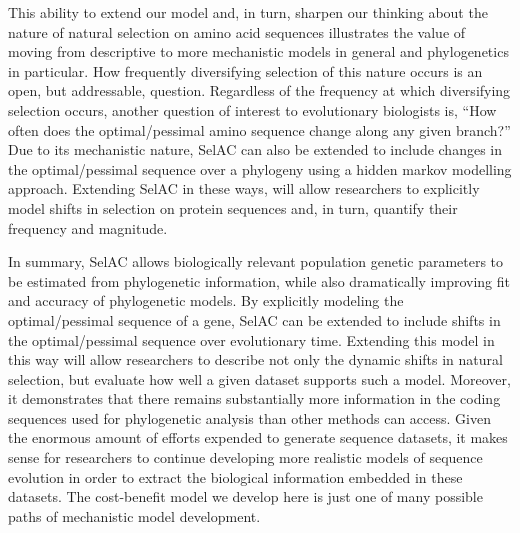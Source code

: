 \documentclass[12pt,letterpaper,fleqn]{article}
\newcommand{\PC}{physicochemical\xspace}
\newcommand{\selac}{SelAC\xspace}
\begin{document}
This ability to extend our model and, in turn, sharpen our thinking about the nature of natural selection on amino acid sequences illustrates the value of moving from descriptive to more mechanistic models in general and phylogenetics in particular.
How frequently diversifying selection of this nature occurs is an open, but addressable, question.
Regardless of the frequency at which diversifying selection occurs, another question of interest to evolutionary biologists is, ``How often does the optimal/pessimal amino sequence change along any given branch?''
Due to its mechanistic nature, \selac can also be extended to include changes in the optimal/pessimal sequence over a  phylogeny using a hidden markov modelling approach.
Extending \selac in these ways, will allow researchers to explicitly model shifts in selection on protein sequences and, in turn, quantify their frequency and magnitude.


In summary, \selac allows biologically relevant population genetic parameters to be estimated from phylogenetic information, while also dramatically improving fit and accuracy of phylogenetic models.
By explicitly modeling the optimal/pessimal sequence of a gene, \selac can be extended to include shifts in the optimal/pessimal sequence over evolutionary time.
Extending this model in this way will allow researchers to describe not only the dynamic shifts in natural selection, but evaluate how well a given dataset supports such a model.
Moreover, it demonstrates that there remains substantially more information in the coding sequences used for phylogenetic analysis than other methods can access.
Given the enormous amount of efforts expended to generate sequence datasets, it makes sense for researchers to continue developing more realistic models of sequence evolution in order to extract the biological information embedded in these datasets.
The cost-benefit model we develop here is just one of many possible paths of mechanistic model development.
\end{document}
